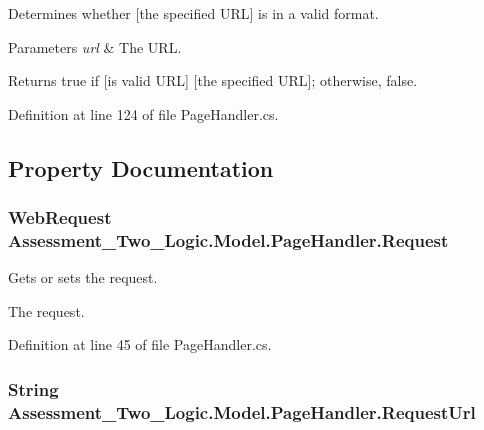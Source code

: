 Determines whether \mbox{[}the specified URL\mbox{]} is in a valid format. 


\begin{DoxyParams}{Parameters}
{\em url} & The URL.\\
\hline
\end{DoxyParams}
\begin{DoxyReturn}{Returns}
{\ttfamily true} if \mbox{[}is valid URL\mbox{]} \mbox{[}the specified URL\mbox{]}; otherwise, {\ttfamily false}. 
\end{DoxyReturn}


Definition at line 124 of file PageHandler.cs.



\subsection{Property Documentation}
\hypertarget{class_assessment___two___logic_1_1_model_1_1_page_handler_a792c28137ad90ab3cec4b3750eb370d3}{
\subsubsection[{Request}]{\setlength{\rightskip}{0pt plus 5cm}WebRequest Assessment\_\-Two\_\-Logic.Model.PageHandler.Request}}
\label{class_assessment___two___logic_1_1_model_1_1_page_handler_a792c28137ad90ab3cec4b3750eb370d3}


Gets or sets the request. 

The request.

Definition at line 45 of file PageHandler.cs.

\hypertarget{class_assessment___two___logic_1_1_model_1_1_page_handler_abda47f97c5e49c05084145e753f4db2c}{
\subsubsection[{RequestUrl}]{\setlength{\rightskip}{0pt plus 5cm}String Assessment\_\-Two\_\-Logic.Model.PageHandler.RequestUrl}}
\label{class_assessment___two___logic_1_1_model_1_1_page_handler_abda47f97c5e49c05084145e753f4db2c}


